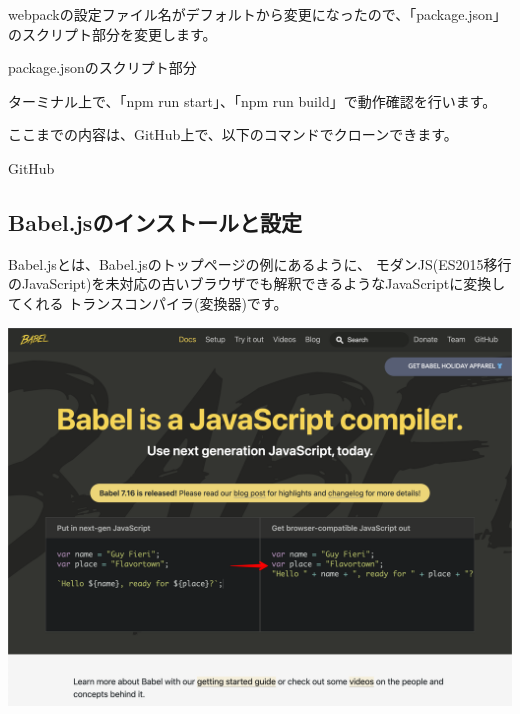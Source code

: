 webpackの設定ファイル名がデフォルトから変更になったので、「package.json」のスクリプト部分を変更します。

\def\startercodeblockfontsize{}
\begin{starterprogram}[]{package.jsonのスクリプト部分}\end{starterprogram}

ターミナル上で、「npm run start」、「npm run build」で動作確認を行います。

\begin{starternote}[]{}

ここまでの内容は、GitHub上で、以下のコマンドでクローンできます。

\def\startercodeblockfontsize{}
\begin{starterterminal}[]{GitHub}\end{starterterminal}
\end{starternote}

\subsection{Babel.jsのインストールと設定}
\keeplastskip{
  \label{sec:2-2-6}
  \label{sec04-babeljs}
  \par\nobreak
}

Babel.jsとは、Babel.jsのトップページの例にあるように、
モダンJS(ES2015移行のJavaScript)を未対応の古いブラウザでも解釈できるようなJavaScriptに変換してくれる
トランスコンパイラ(変換器)です。

\begin{reviewimage}[H]%
\includegraphics[width=0.9\maxwidth]{./images/02-create-react-app/babel01.png}%
\label{image:02-create-react-app:babel01}
\end{reviewimage}

